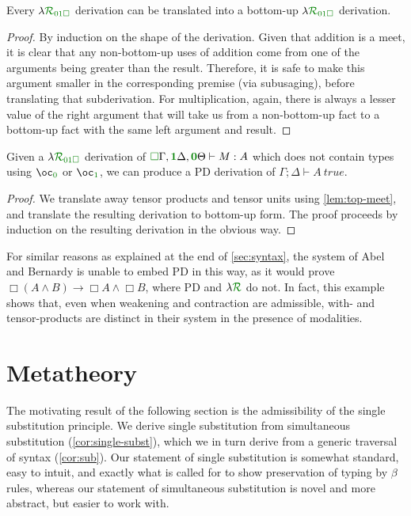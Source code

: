 \documentclass[submission,copyright,creativecommons]{eptcs}
\begin{document}
\begin{lemma}
  Every $\name_{\instPD}$ derivation can be translated into a bottom-up
  $\name_{\instPD}$ derivation.
\end{lemma}
\begin{proof}
  By induction on the shape of the derivation.
  Given that addition is a meet, it is clear that any non-bottom-up uses of
  addition come from one of the arguments being greater than the result.
  Therefore, it is safe to make this argument smaller in the corresponding
  premise (via subusaging), before translating that subderivation.
  For multiplication, again, there is always a lesser value of the right
  argument that will take us from a non-bottom-up fact to a bottom-up fact with
  the same left argument and result.
\end{proof}

\begin{proposition}[\name{} $\to$ PD]
  Given a $\name_{\instPD}$ derivation of
  $\ctx{\Gamma}{\vct\valid}, \ctx{\Delta}{\vct\true}, \ctx{\Theta}{\vct\unused}
  \vdash M : A$ which does not contain types using $\excl{\unused}{}$ or
  $\excl{\true}{}$, we can produce a PD derivation of
  $\Gamma; \Delta \vdash A~\mathit{true}$.
\end{proposition}
\begin{proof}
  We translate away tensor products and tensor units using
  \autoref{lem:top-meet}, and translate the resulting derivation to bottom-up
  form.
  The proof proceeds by induction on the resulting derivation in the obvious
  way.
\end{proof}

For similar reasons as explained at the end of \autoref{sec:syntax}, the
system of Abel and Bernardy \cite{AbelBernardy2020} is unable to embed PD in
this way, as it would prove
$\Box(A \wedge B) \to \Box A \wedge \Box B$, where PD and $\name$ do not.
In fact, this example shows that, even when weakening and contraction are
admissible, with- and tensor-products are distinct in their system in the
presence of modalities.

\section{Metatheory}\label{sec:metatheory}

The motivating result of the following section is the admissibility of the
single substitution principle.
We derive single substitution from simultaneous substitution
(\autoref{cor:single-subst}), which we in turn derive from a generic traversal
of syntax (\autoref{cor:sub}).
Our statement of single substitution is somewhat standard, easy to intuit, and
exactly what is called for to show preservation of typing by $\beta$ rules,
whereas our statement of simultaneous substitution is novel and more abstract,
but easier to work with.
\end{document}
